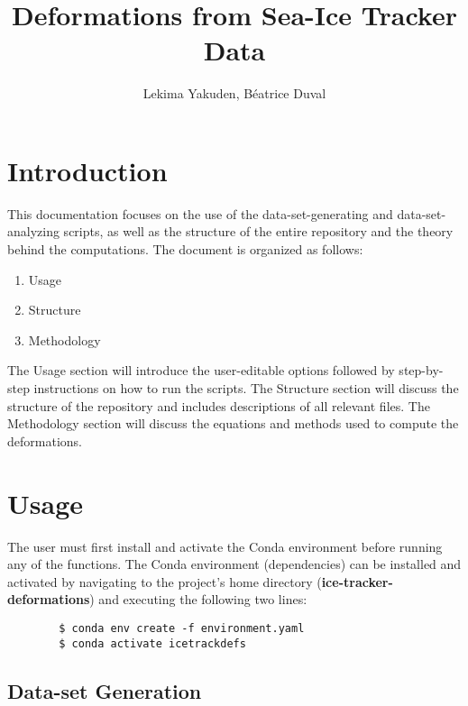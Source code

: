 \documentclass{article}
\begin{document}
\title{Deformations from Sea-Ice Tracker Data}

\author{Lekima Yakuden, Béatrice Duval}

\maketitle

\tableofcontents

\newpage

\section{Introduction}

    This documentation focuses on the use of the data-set-generating and data-set-analyzing scripts, as well as the structure of the entire repository and the theory behind the computations. The document is organized as follows:
    \begin{enumerate}
        \item Usage
        \item Structure
        \item Methodology
    \end{enumerate}
    The Usage section will introduce the user-editable options followed by step-by-step instructions on how to run the scripts. The Structure section will discuss the structure of the repository and includes descriptions of all relevant files. The Methodology section will discuss the equations and methods used to compute the deformations.

\section{Usage}
\label{Usage}

    The user must first install and activate the Conda environment before running any of the functions. The Conda environment (dependencies) can be installed and activated by navigating to the project's home directory (\textbf{ice-tracker-deformations}) and executing the following two lines:
    \begin{verbatim}
        $ conda env create -f environment.yaml
        $ conda activate icetrackdefs
    \end{verbatim}

    \subsection{Data-set Generation}
\end{document}

